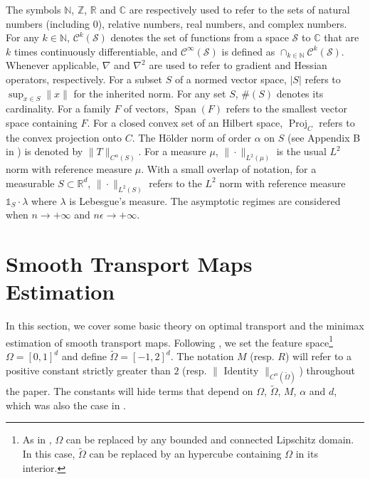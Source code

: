 \documentclass{article}
\theoremstyle{plain}
\theoremstyle{definition}
\theoremstyle{remark}
\newcommand{\R}[0]{\mathbb{R}}
\newcommand{\C}[0]{\mathbb{C}}
\newcommand{\N}[0]{\mathbb{N}}
\newcommand{\Z}[0]{\mathbb{Z}}
\newcommand{\Ind}[0]{\mathds{1}}
\newcommand\card[1]{\# \left( {#1}\right)}
\newcommand\proj[0]{\operatorname{Proj}}
\newcommand\vspan[0]{\operatorname{Span}}
\begin{document}
The symbols $\N$, $\Z$, $\R$ and $\C$ are respectively used to refer to the sets of natural numbers (including $0$), relative numbers, real numbers, and complex numbers.
For any $k \in \N$, $\mathcal{C}^k(\mathcal{S})$ denotes the set of functions from a space $\mathcal{S}$ to $\C$ that are $k$ times continuously differentiable, and $\mathcal{C}^{\infty}(\mathcal{S})$ is defined as $\cap_{k \in \N} \mathcal{C}^k(\mathcal{S})$. 
Whenever applicable, $\nabla$ and $\nabla^2$ are used to refer to gradient and Hessian operators, respectively.
For a subset $S$ of a normed vector space, $|S|$ refers to $\sup_{x \in S} \|x\|$ for the inherited norm. 
For any set $S$, $\card{S}$ denotes its cardinality. 
For a family $F$ of vectors, $\vspan(F)$ refers to the smallest vector space containing $F$.
For a closed convex set of an Hilbert space, $\proj_C$ refers to the convex projection onto $C$.
The Hölder norm of order $\alpha$ on $S$ (see Appendix B in \cite{hutter2021minimax}) is denoted by $\| T \|_{C^{\alpha}(S)}$. 
For a measure $\mu$, $\|  \cdot \|_{L^2(\mu)}$ is the usual $L^2$ norm with reference measure $\mu$. 
With a small overlap of notation, for a measurable $S \subset \R^d$, $\|\cdot\|_{L^2(S)}$ refers to the $L^2$ norm with reference measure $\Ind_S \cdot \lambda$ where $\lambda$ is Lebesgue's measure.
The asymptotic regimes are considered when $n \rightarrow + \infty$ and $n \epsilon \rightarrow + \infty$. 



\section{Smooth Transport Maps Estimation}
\label{sec:problem}

In this section, we cover some basic theory on optimal transport and the minimax estimation of smooth transport maps. 
Following \cite{hutter2021minimax}, we set the feature space\footnote{As in \cite{hutter2021minimax}, $\Omega$ can be replaced by any bounded and connected Lipschitz domain. In this case, $\tilde{\Omega}$ can be replaced by an hypercube containing $\Omega$ in its interior.} $\Omega = [0, 1]^d$ and define $\tilde{\Omega} = [-1, 2]^d$. The notation $M$ (resp. $R$) will refer to a positive constant strictly greater than $2$ (resp. $\| \text{ Identity } \|_{C^{\alpha}(\tilde{\Omega})}$) throughout the paper. 
The constants will hide terms that depend on $\Omega$, $\tilde{\Omega}$, $M$, $\alpha$ and $d$, which was also the case in \cite{hutter2021minimax}.
\end{document}
